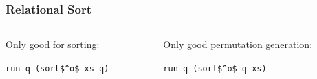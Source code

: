 \documentclass[xcolor=table, aspectratio=169]{beamer}
\begin{document}
\begin{frame}[fragile]
  \frametitle{Relational Sort}
\begin{columns}
  \begin{column}[t]{0.49\textwidth}
    

    \vfill

    \begin{center}
      Only good for sorting:

      \lstinline{run q (sort$^o$ xs q)}
    \end{center}

  \end{column}
  \begin{column}[t]{0.49\textwidth}
    

    \vfill

    \begin{center}
      Only good permutation generation:

      \lstinline{run q (sort$^o$ q xs)}
    \end{center}


  \end{column}
\end{columns}
\end{frame}
\end{document}
